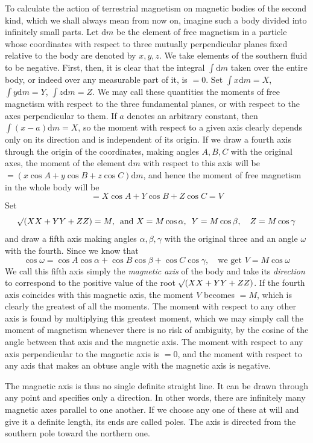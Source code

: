 To calculate the action of terrestrial magnetism on magnetic bodies of the second kind, which we shall always mean from now on, imagine such a body divided into infinitely small parts. Let $\mathrm{d}m$ be the element of free magnetism in a particle whose coordinates with respect to three mutually perpendicular planes fixed relative to the body are denoted by $x,y,z$. We take elements of the southern fluid to be negative. First, then, it is clear that the integral $\int\mathrm{d}m$ taken over the entire body, or indeed over any measurable part of it, is $=0$. Set $\int x\mathrm{d}m=X$, $\int y\mathrm{d}m=Y$, $\int z\mathrm{d}m=Z$. We may call these quantities the moments of free magnetism with respect to the three fundamental planes, or with respect to the axes perpendicular to them. If $a$ denotes an arbitrary constant, then $\int(x-a)\mathrm{d}m=X$, so the moment with respect to a given axis clearly depends only on its direction and is independent of its origin. If we draw a fourth axis through the origin of the coordinates, making angles $A,B,C$ with the original axes, the moment of the element $\mathrm{d}m$ with respect to this axis will be $=(x\cos A+y\cos B+z\cos C)\mathrm{d}m$, and hence the moment of free magnetism in the whole body will be
\[
=X\cos A+Y\cos B+Z\cos C=V
\]
Set
\[
\mathord{{}^{}\!\surd}(XX+YY+ZZ)=M,\enspace\text{and }X=M\cos\alpha,\enspace Y=M\cos\beta,\quad Z=M\cos\gamma
\]
and draw a fifth axis making angles $\alpha,\beta,\gamma$ with the original three and an angle $\omega$ with the fourth. Since we know that
\[
\cos\omega=\cos A\cos\alpha+\cos B\cos\beta+\cos C\cos\gamma,\quad\text{we get }V=M\cos\omega
\]
We call this fifth axis simply the \textit{magnetic axis} of the body and take its \textit{direction} to correspond to the positive value of the root $\mathord{{}^{}\!\surd}(XX+YY+ZZ)$. If the fourth axis coincides with this magnetic axis, the moment $V$ becomes $=M$, which is clearly the greatest of all the moments. The moment with respect to any other axis is found by multiplying this greatest moment, which we may simply call the moment of magnetism whenever there is no risk of ambiguity, by the cosine of the angle between that axis and the magnetic axis. The moment with respect to any axis perpendicular to the magnetic axis is $=0$, and the moment with respect to any axis that makes an obtuse angle with the magnetic axis is negative.

The magnetic axis is thus no single definite straight line. It can be drawn through any point and specifies only a direction. In other words, there are infinitely many magnetic axes parallel to one another. If we choose any one of these at will and give it a definite length, its ends are called poles. The axis is directed from the southern pole toward the northern one.

